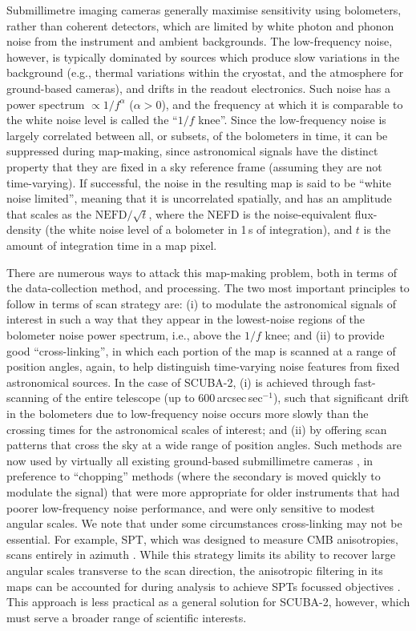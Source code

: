 \documentclass[useAMS,usenatbib,nofootinbib]{mn2e}
\newcommand{\scuba}{SCUBA-2}
\begin{document}
Submillimetre imaging cameras generally maximise sensitivity using
bolometers, rather than coherent detectors, which are limited by white
photon and phonon noise from the instrument and ambient
backgrounds. The low-frequency noise, however, is typically dominated
by sources which produce slow variations in the background (e.g.,
thermal variations within the cryostat, and the atmosphere for
ground-based cameras), and drifts in the readout electronics. Such
noise has a power spectrum $\propto 1/f^\alpha$ ($\alpha>0$), and the
frequency at which it is comparable to the white noise level is called
the ``$1/f$ knee''. Since the low-frequency noise is largely
correlated between all, or subsets, of the bolometers in time, it can
be suppressed during map-making, since astronomical signals have the
distinct property that they are fixed in a sky reference frame
(assuming they are not time-varying). If successful, the noise in the
resulting map is said to be ``white noise limited'', meaning that it
is uncorrelated spatially, and has an amplitude that scales as the
$\mathrm{NEFD}/\sqrt{t}$, where the NEFD is the noise-equivalent
flux-density (the white noise level of a bolometer in 1\,s of
integration), and $t$ is the amount of integration time in a map
pixel.

There are numerous ways to attack this map-making problem, both in
terms of the data-collection method, and processing. The two most
important principles to follow in terms of scan strategy are: (i) to
modulate the astronomical signals of interest in such a way that they
appear in the lowest-noise regions of the bolometer noise power
spectrum, i.e., above the $1/f$ knee; and (ii) to provide good
``cross-linking'', in which each portion of the map is scanned at a
range of position angles, again, to help distinguish time-varying
noise features from fixed astronomical sources. In the case of \scuba,
(i) is achieved through fast-scanning of the entire telescope (up to
600\,arcsec\,sec$^{-1}$), such that significant drift in the
bolometers due to low-frequency noise occurs more slowly than the
crossing times for the astronomical scales of interest; and (ii) by
offering scan patterns that cross the sky at a wide range of position
angles. Such methods are now used by virtually all existing
ground-based submillimetre cameras
\citep[e.g.,][]{glenn1998,weferling2002,wilson2008,kovacs2008b}, in
preference to ``chopping'' methods (where the secondary is moved
quickly to modulate the signal) that were more appropriate for older
instruments that had poorer low-frequency noise performance, and were
only sensitive to modest angular scales. We note that under some
circumstances cross-linking may not be essential. For example, SPT,
which was designed to measure CMB anisotropies, scans entirely in
azimuth \citep{schaffer2011}. While this strategy limits its ability
to recover large angular scales transverse to the scan direction, the
anisotropic filtering in its maps can be accounted for during analysis
to achieve SPTs focussed objectives \citep[in contrast, the similar
ACT experiment uses cross-linking to improve its response to
large-angular scales,][]{das2011}. This approach is less practical as
a general solution for \scuba, however, which must serve a broader
range of scientific interests.
\end{document}
